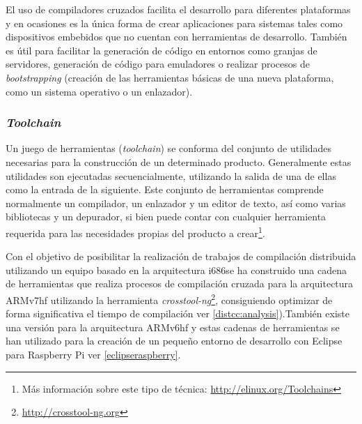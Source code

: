 El uso de compiladores cruzados facilita el desarrollo para diferentes plataformas y en ocasiones es la única forma de crear aplicaciones para sistemas tales como dispositivos embebidos que no cuentan con herramientas de desarrollo. También es útil para facilitar la generación de código en entornos como granjas de servidores, generación de código para emuladores o realizar procesos de \textit{bootstrapping} (creación de las herramientas básicas de una nueva plataforma, como un sistema operativo o un enlazador).


\subsubsection{\textit{Toolchain}}

Un juego de herramientas (\textit{toolchain}) se conforma del conjunto de utilidades necesarias para la construcción de un determinado producto. Generalmente estas utilidades son ejecutadas secuencialmente, utilizando la salida de una de ellas como la entrada de la siguiente. Este conjunto de herramientas comprende normalmente un compilador, un enlazador y un editor de texto, así como varias bibliotecas y un depurador, si bien puede contar con cualquier herramienta requerida para las necesidades propias del producto a crear\footnote{Más información sobre este tipo de técnica: \href{http://elinux.org/Toolchains}{http://elinux.org/Toolchains}}.

Con el objetivo de posibilitar la realización de trabajos de compilación distribuida utilizando un equipo basado en la arquitectura i686 se ha construido una cadena de herramientas que realiza procesos de compilación cruzada para la arquitectura ARMv7hf utilizando la herramienta \textit{crosstool-ng}\footnote{\href{http://www.crosstool-ng.org/}{http://crosstool-ng.org}}, consiguiendo optimizar de forma significativa el tiempo de compilación ver \ref{distcc:analysis}).También existe una versión para la arquitectura ARMv6hf \citationneeded[crear] y estas cadenas de  herramientas se han utilizado para la creación de un pequeño entorno de desarrollo con Eclipse para Raspberry Pi ver \ref{eclipseraspberry}.

